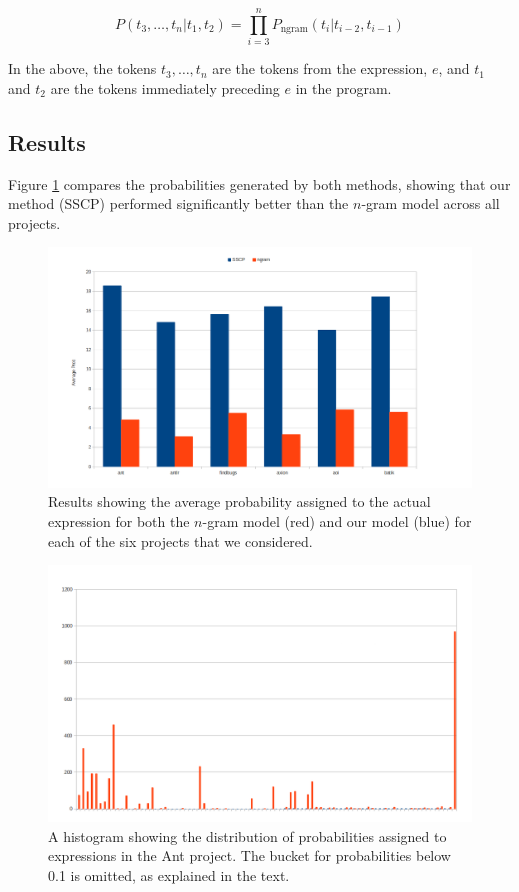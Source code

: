 \documentclass{article} %
\begin{document}
$$P(t_3, \ldots, t_n | t_1, t_2) = \prod_{i=3}^n P_{\text{ngram}}(t_i | t_{i-2}, t_{i-1})$$

In the above, the tokens $t_3, \ldots, t_n$ are the tokens from the expression, $e$, and $t_1$ and $t_2$ are the tokens immediately preceding $e$ in the program.

\subsection*{Results}
Figure \ref{results} compares the probabilities generated by both methods, showing that our method (SSCP) performed significantly better than the $n$-gram model across all projects.
\begin{figure}
\begin{centering}
\includegraphics[scale=0.4]{overall.png}
\end{centering}
\caption{Results showing the average probability assigned to the actual expression for both the $n$-gram model (red) and our model (blue) for each of the six projects that we considered.\label{results}}
\end{figure}

\begin{figure}
\begin{centering}
\includegraphics[scale=0.4]{ant.png}
\end{centering}
\caption{A histogram showing the distribution of probabilities assigned to expressions in the Ant project. The bucket for probabilities below 0.1 is omitted, as explained in the text. \label{hist}}
\end{figure}
\end{document}
